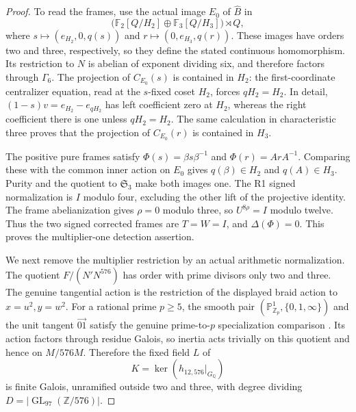 \begin{proof}
To read the frames, use the actual image $E_0$ of $\widehat B$
in
\[
 \bigl(\mathbb F_2[Q/H_2]\oplus\mathbb F_3[Q/H_3]\bigr)
                         \rtimes Q,
\]
where
$s\mapsto(e_{H_2},0,q(s))$ and
$r\mapsto(0,e_{H_3},q(r))$. These images have orders two and
three, respectively, so they define the stated continuous
homomorphism. Its restriction to $N$ is abelian of exponent
dividing six, and therefore factors through $\Gamma_6$.
The projection of $C_{E_0}(s)$ is contained in $H_2$:
the first-coordinate centralizer equation, read at the
$s$-fixed coset $H_2$, forces $qH_2=H_2$. In detail,
$(1-s)v=e_{H_2}-e_{qH_2}$ has left coefficient zero at
$H_2$, whereas the right coefficient there is one unless
$qH_2=H_2$. The same calculation in characteristic three
proves that the projection of $C_{E_0}(r)$ is contained in
$H_3$.

The positive pure frames satisfy
$\Phi(s)=\beta s\beta^{-1}$ and $\Phi(r)=ArA^{-1}$.
Comparing these with the common inner action on $E_0$
gives $q(\beta)\in H_2$ and $q(A)\in H_3$.
Purity and the quotient to $\mathfrak S_3$ make both images
one. The R1 signed normalization is $I$ modulo four,
excluding the other lift of the projective identity.
The frame abelianization gives $\rho=0$ modulo three,
so $U^{8\rho}=I$ modulo twelve. Thus the two signed
corrected frames are $T=W=I$, and $\Delta(\Phi)=0$.
This proves the multiplier-one detection assertion.

We next remove the multiplier restriction by an actual arithmetic
normalization. The quotient $F/(N'N^{576})$ has order with
prime divisors only two and three. The genuine tangential action
is the restriction of the displayed braid action to
$x=u^2,y=w^2$. For a rational prime $p\ge5$, the smooth
pair $(\mathbb P^1_{\mathbb Z_p},\{0,1,\infty\})$ and the
unit tangent $\overrightarrow{01}$ satisfy the genuine
prime-to-$p$ specialization comparison
\cite[Lemma 8.7]{Petrov2023}. Its action factors through
residue Galois, so inertia acts trivially on this quotient
and hence on $M/576M$. Therefore the fixed field $L$ of
\[
 K=\ker(h_{12,576}|_{G_{\mathbb Q}})
\]
is finite Galois, unramified outside two and three, with
degree dividing $D=|\operatorname{GL}_{97}(\mathbb Z/576)|$.


\end{proof}
